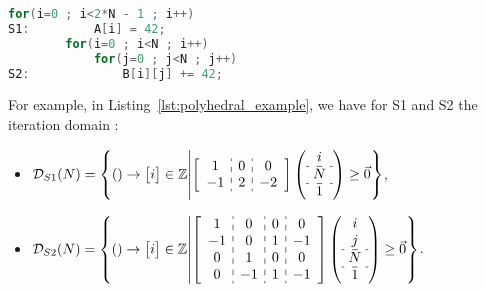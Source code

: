 \documentclass[paper=a4, fontsize=11pt]{scrartcl}
\numberwithin{equation}{section}        %
\numberwithin{figure}{section}          %
\numberwithin{table}{section}               %
\begin{document}
\begin{lstlisting}[frame=single, language=C, caption={Simple code for polyhedral model example}, label={lst:polyhedral_example}]
        for(i=0 ; i<2*N - 1 ; i++)
S1:         A[i] = 42;
        for(i=0 ; i<N ; i++)
            for(j=0 ; j<N ; j++)
S2:             B[i][j] += 42;
\end{lstlisting}
        
        For example, in Listing~\ref{lst:polyhedral_example}, we have for
        S1 and S2 the iteration domain :
        \begin{itemize}
            \item[]$ \mathcal{D}_{S1}(N) = \left\{() \to \begin{bmatrix}i\end{bmatrix} \in \mathbb{Z} \middle|
            \left[\begin{array}{c:c:c}
                    1 & 0 & 0 \\
                    -1 & 2 & -2
            \end{array}\right]
            \left(\begin{array}{c}
                    i \\ \hdashline
                    N \\ \hdashline
                    1 
            \end{array}\right)
            \geq \vec{0}
            \right\} $,
        
            \item[]$ \mathcal{D}_{S2}(N) = \left\{() \to \begin{bmatrix}i\end{bmatrix} \in \mathbb{Z} \middle|
            \left[\begin{array}{c:c:c:c}
                    1 & 0 & 0 & 0\\
                    -1 & 0 & 1 & -1\\
                    0 & 1 & 0 & 0\\
                    0 & -1 & 1 & -1
            \end{array}\right]
            \left(\begin{array}{c}
                    i \\
                    j \\ \hdashline
                    N \\ \hdashline
                    1 
            \end{array}\right)
            \geq \vec{0}
            \right\} $.
        \end{itemize}
\end{document}
